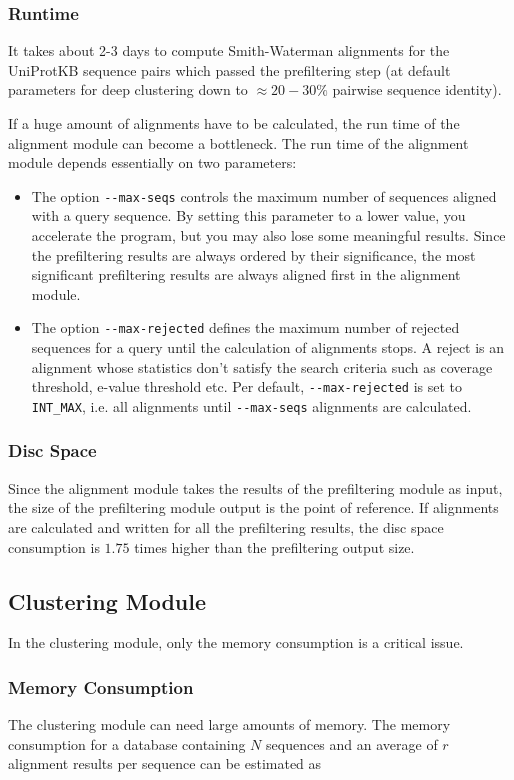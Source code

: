 \documentclass[11pt,a4paper]{scrreprt}
\begin{document}
\subsubsection{Runtime}
It takes about 2-3 days to compute Smith-Waterman alignments for the UniProtKB sequence pairs which passed the prefiltering step (at default parameters for deep clustering down to $\approx 20 - 30\%$ pairwise sequence identity).

If a huge amount of alignments have to be calculated, the run time of the alignment module can become a bottleneck. The run time of the alignment module depends essentially on two parameters:
\begin{itemize}
\item The option \texttt{-{}-max-seqs} controls the maximum number of sequences aligned with a query sequence. By setting this parameter to a lower value, you accelerate the program, but you may also lose some meaningful results. Since the prefiltering results are always ordered by their significance, the most significant prefiltering results are always aligned first in the alignment module.
\item The option \texttt{-{}-max-rejected} defines the maximum number of rejected sequences for a query until the calculation of alignments stops. A reject is an alignment whose statistics don't satisfy the search criteria such as coverage threshold, e-value threshold etc. Per default, \texttt{-{}-max-rejected} is set to \texttt{INT\_MAX}, i.e. all alignments until \texttt{-{}-max-seqs} alignments are calculated.
\end{itemize}
\subsubsection{Disc Space}
Since the alignment module takes the results of the prefiltering module as input, the size of the prefiltering module output is the point of reference. If alignments are calculated and written for all the prefiltering results, the disc space consumption is $1.75$ times higher than the prefiltering output size.

\subsection{Clustering Module}
In the clustering module, only the memory consumption is a critical issue.
\subsubsection{Memory Consumption}
The clustering module can need large amounts of memory. The memory consumption for a database containing $N$ sequences and an average of $r$ alignment results per sequence can be estimated as
\end{document}
